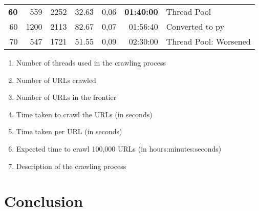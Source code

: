 \begin{table}[!ht]
\begin{tabular}{rrrrrrl}
    \textbf{60}  & 559          & 2252         & 32.63        & 0,06         & \textbf{01:40:00} & Thread Pool              \\
    60           & 1200         & 2113         & 82.67        & 0,07         & 01:56:40          & Converted to py          \\
    70           & 547          & 1721         & 51.55        & 0,09         & 02:30:00          & Thread Pool: Worsened    \\
  \end{tabular}
\end{table}

\begin{enumerate}
  \item Number of threads used in the crawling process
  \item Number of URLs crawled
  \item Number of URLs in the frontier
  \item Time taken to crawl the URLs (in seconds)
  \item Time taken per URL (in seconds)
  \item Expected time to crawl 100,000 URLs (in hours:minutes:seconds)
  \item Description of the crawling process
\end{enumerate}


\section{Conclusion}






